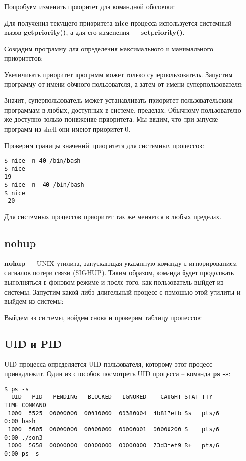 \documentclass[a4paper]{article}
\begin{document}
	Попробуем изменить приоритет для командной оболочки:
	

	Для получения текущего приоритета \textbf{nice} процесса используется системный вызов \textbf{getpriority()}, а для его изменения — \textbf{setpriority()}.
	
	Создадим программу для определения максимального и манимального приоритетов:
		
	
	Увеличивать приоритет программ может только суперпользователь. Запустим программу от имени обчного пользователя, а затем от имени суперпользователя:
		
	
	Значит, суперпользователь может устанавливать приоритет пользовательским программам в любых, доступных в системе, пределах. Обычному пользователю же доступно только понижение приоритета. Мы видим, что при запуске программ из shell они имеют приоритет 0.

Проверим границы значений приоритета для системных процессов:
	\begin{lstlisting}[style=crs_bash]	
$ nice -n 40 /bin/bash
$ nice
19
$ nice -n -40 /bin/bash
$ nice
-20
	\end{lstlisting}
	
	Для системных процессов приоритет так же меняется в любых пределах.
	
	\subsection{nohup}
	\textbf{nohup} --- UNIX-утилита, запускающая указанную команду с игнорированием сигналов потери связи (SIGHUP). Таким образом, команда будет продолжать выполняться в фоновом режиме и после того, как пользователь выйдет из системы.
	Запустим какой-либо длительный процесс с помощью этой утилиты и выйдем из системы:
		
	
	Выйдем из системы, войдем снова и проверим таблицу процессов:
		
	
	\subsection{UID и PID}
	UID процесса определяется UID пользователя, которому этот процесс принадлежит. Один из способов посмотреть UID процесса -- команда \textbf{ps -s}:
	\begin{lstlisting}[style=crs_bash]	
$ ps -s
  UID   PID   PENDING   BLOCKED   IGNORED    CAUGHT STAT TTY        TIME COMMAND
 1000  5525  00000000  00010000  00380004  4b817efb Ss   pts/6      0:00 bash
 1000  5605  00000000  00000000  00000001  00000200 S    pts/6      0:00 ./son3
 1000  5658  00000000  00000000  00000000  73d3fef9 R+   pts/6      0:00 ps -s
	\end{lstlisting}
	
\end{document}

